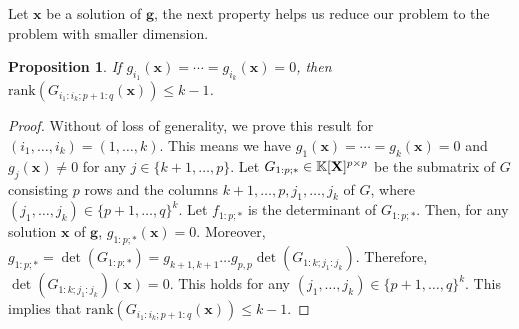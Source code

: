\documentclass[11pt]{article}
\numberwithin{Property}{section}
\numberwithin{Theorem}{section}
\newtheorem{Proposition}{Proposition}%
\numberwithin{Proposition}{section}
\numberwithin{Lemma}{section}
\numberwithin{Corollary}{section}
\numberwithin{Definition}{section}
\numberwithin{Remark}{section}
\numberwithin{Conjecture}{section}
\numberwithin{Problem}{section}
\numberwithin{Claim}{section}
\theoremstyle{definition}
\numberwithin{Example}{section}
\def\g {\ensuremath{\mathbf{g}}}
\renewcommand{\leq}{\leqslant}
\newcommand{\field}{\mathbb{K}} %
\newcommand{\mat}[1]{\mathbf{\MakeUppercase{#1}}} %
\begin{document}
Let $\mathbf{x}$ be a solution of $\g$, the next property helps us reduce our problem to the problem with smaller dimension. 
\begin{Proposition} \label{r2}
If $g_{i_1}(\mathbf{x}) = \cdots = g_{i_k}(\mathbf{x}) = 0$, then $\mathrm{rank}(G_{i_1:i_k\mathbf{;}p+1:q}({\mathbf{x}})) \leq k-1$.
\end{Proposition}
\begin{proof} Without of loss of generality, we prove this result for $(i_1, \ldots, i_k) = (1, \ldots, k)$. This means we have $g_{1}(\mathbf{x}) = \cdots = g_{k}(\mathbf{x}) = 0$ and $g_{j}(\mathbf{x}) \ne 0$ for any $j \in \{k+1, \ldots, p\}$. Let $G_{1:p;*} \in \field[\mat{X}]^{p \times p}$ be the submatrix of $G$ consisting $p$ rows and the columns $k+1, \ldots, p, j_1, \ldots, j_k$ of $G$, where $(j_1, \ldots, j_k) \in \{p+1, \ldots, q\}^{k}$. Let $f_{1:p;*}$ is the determinant of $G_{1:p;*}$. Then, for any solution $\mathbf{x}$ of $\g$, $g_{1:p;*}(\mathbf{x}) = 0$. Moreover, $g_{1:p;*} = \det(G_{1:p;*}) = g_{k+1,k+1} \ldots g_{p,p} \det(G_{1:k;j_1:j_k})$. Therefore, $\det(G_{1:k;j_1:j_k})(\mathbf{x}) = 0$. This holds for any $(j_1, \ldots, j_k) \in \{p+1, \ldots, q\}^{k}$. This implies that $\mathrm{rank}(G_{i_1:i_k\mathbf{;}p+1:q}({\mathbf{x}})) \leq k-1$. 
\end{proof}
\end{document}
